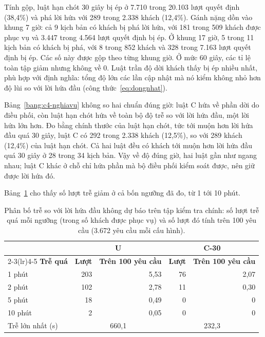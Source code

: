Tính gộp, luật hạn chót 30 giây bị ép ở 7.710 trong 20.103 lượt quyết định (38,4\%) và phá lời hứa với 289 trong 2.338
khách (12,4\%). Gánh nặng dồn vào khung 7 giờ: cả 9 kịch bản có khách bị phá lời hứa, với 181 trong 509 khách được phục
vụ và 3.447 trong 4.564 lượt quyết định bị ép. Ở khung 17 giờ, 5 trong 11 kịch bản có khách bị phá, với 8 trong 852
khách và 328 trong 7.163 lượt quyết định bị ép. Các số này được gộp theo từng khung giờ. Ở mức 60 giây, các tỉ lệ toàn
tập giảm nhưng không về 0. Luật trần độ dời khách thấy bị ép nhiều nhất, phù hợp với định nghĩa: tổng độ lớn các lần
cập nhật mà nó kiểm không nhỏ hơn độ lùi so với lời hứa đầu (công thức~\eqref{eq:dongnhat}).

Bảng~\ref{bang:c4-nghiavu} không so hai chuẩn đúng giờ: luật C hứa về phần dời do điều phối, còn luật hạn chót hứa về
toàn bộ độ trễ so với lời hứa đầu, một lời hứa lớn hơn. Đo bằng chính thước của luật hạn chót, tức tới muộn hơn lời
hứa đầu quá 30 giây, luật C có 292 trong 2.338 khách (12,5\%), so với 289 khách (12,4\%) của luật hạn chót. Cả hai
luật đều có khách tới muộn hơn lời hứa đầu quá 30 giây ở 28 trong 34 kịch bản. Vậy về độ đúng giờ, hai luật gần như
ngang nhau; luật C khác ở chỗ chỉ hứa phần mà bộ điều phối kiểm soát được, nên giữ được lời hứa đó.

Bảng~\ref{bang:c4-phanbotre} cho thấy số lượt trễ giảm ở cả bốn ngưỡng đã đo, từ 1 tới 10 phút.

\begin{table}[htbp]
\centering
\caption{Phân bố trễ so với lời hứa đầu không dự báo trên tập kiểm tra chính: số lượt trễ quá mỗi ngưỡng
(trong số khách được phục vụ) và số lượt đó tính trên 100 yêu cầu (3.672 yêu cầu mỗi cấu hình).}
\label{bang:c4-phanbotre}
\small
\begin{tabular}{@{}lrrrr@{}}
\toprule
& \multicolumn{2}{c}{\textbf{U}} & \multicolumn{2}{c}{\textbf{C-30}}\\
\cmidrule(lr){2-3}\cmidrule(lr){4-5}
\textbf{Trễ quá} & \textbf{Lượt} & \textbf{Trên 100 yêu cầu} & \textbf{Lượt} & \textbf{Trên 100 yêu cầu}\\
\midrule
1 phút & 203 & 5,53 & 76 & 2,07\\
2 phút & 102 & 2,78 & 11 & 0,30\\
5 phút & 18 & 0,49 & 0 & 0\\
10 phút & 2 & 0,05 & 0 & 0\\
\midrule
Trễ lớn nhất (s) & \multicolumn{2}{c}{660,1} & \multicolumn{2}{c}{232,3}\\
\bottomrule
\end{tabular}
\end{table}


